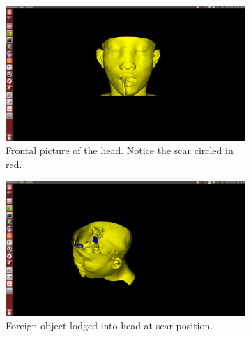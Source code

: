 \documentclass{article}
\begin{document}
\begin{figure}
	\centering
	\begin{subfigure}[b]{0.3\textwidth}
		\includegraphics[width=\textwidth]{skull0}
			\caption{Frontal picture of the head. Notice the scar circled in
			red.}
			\label{fig:skull0}
	\end{subfigure}
	\quad
	\begin{subfigure}[b]{0.3\textwidth}
		\includegraphics[width=\textwidth]{skull1}
			\caption{Foreign object lodged into head at scar position.}
			\label{fig:skull1}
	\end{subfigure}
	\quad
	\begin{subfigure}[b]{0.3\textwidth}

\end{subfigure}
\end{figure}
\end{document}
